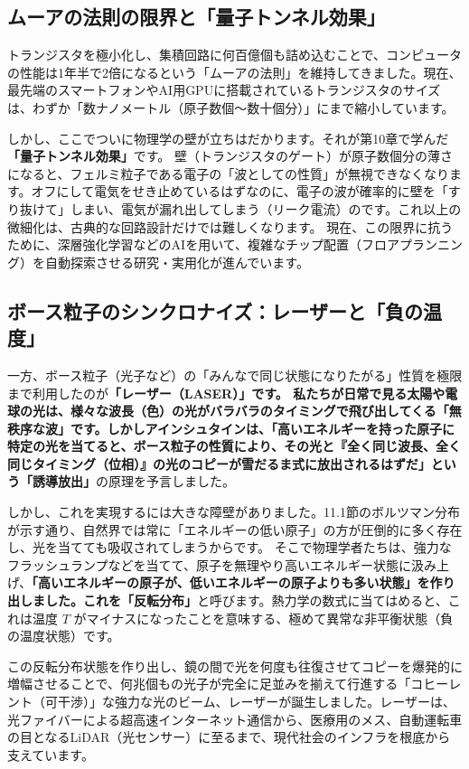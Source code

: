 \subsection{ムーアの法則の限界と「量子トンネル効果」}

トランジスタを極小化し、集積回路に何百億個も詰め込むことで、コンピュータの性能は1年半で2倍になるという「ムーアの法則」を維持してきました。現在、最先端のスマートフォンやAI用GPUに搭載されているトランジスタのサイズは、わずか「数ナノメートル（原子数個〜数十個分）」にまで縮小しています。

しかし、ここでついに物理学の壁が立ちはだかります。それが第10章で学んだ\textbf{「量子トンネル効果」}です。 壁（トランジスタのゲート）が原子数個分の薄さになると、フェルミ粒子である電子の「波としての性質」が無視できなくなります。オフにして電気をせき止めているはずなのに、電子の波が確率的に壁を「すり抜けて」しまい、電気が漏れ出してしまう（リーク電流）のです。これ以上の微細化は、古典的な回路設計だけでは難しくなります。 現在、この限界に抗うために、深層強化学習などのAIを用いて、複雑なチップ配置（フロアプランニング）を自動探索させる研究・実用化が進んでいます。

\subsection{ボース粒子のシンクロナイズ：レーザーと「負の温度」}

一方、ボース粒子（光子など）の「みんなで同じ状態になりたがる」性質を極限まで利用したのが\textbf{「レーザー（LASER）」です。 私たちが日常で見る太陽や電球の光は、様々な波長（色）の光がバラバラのタイミングで飛び出してくる「無秩序な波」です。しかしアインシュタインは、「高いエネルギーを持った原子に特定の光を当てると、ボース粒子の性質により、その光と『全く同じ波長、全く同じタイミング（位相）』の光のコピーが雪だるま式に放出されるはずだ」という「誘導放出」}の原理を予言しました。

しかし、これを実現するには大きな障壁がありました。11.1節のボルツマン分布が示す通り、自然界では常に「エネルギーの低い原子」の方が圧倒的に多く存在し、光を当てても吸収されてしまうからです。 そこで物理学者たちは、強力なフラッシュランプなどを当てて、原子を無理やり高いエネルギー状態に汲み上げ、\textbf{「高いエネルギーの原子が、低いエネルギーの原子よりも多い状態」を作り出しました。これを「反転分布」}と呼びます。熱力学の数式に当てはめると、これは温度 \(T\) がマイナスになったことを意味する、極めて異常な非平衡状態（負の温度状態）です。

この反転分布状態を作り出し、鏡の間で光を何度も往復させてコピーを爆発的に増幅させることで、何兆個もの光子が完全に足並みを揃えて行進する「コヒーレント（可干渉）」な強力な光のビーム、レーザーが誕生しました。レーザーは、光ファイバーによる超高速インターネット通信から、医療用のメス、自動運転車の目となるLiDAR（光センサー）に至るまで、現代社会のインフラを根底から支えています。

